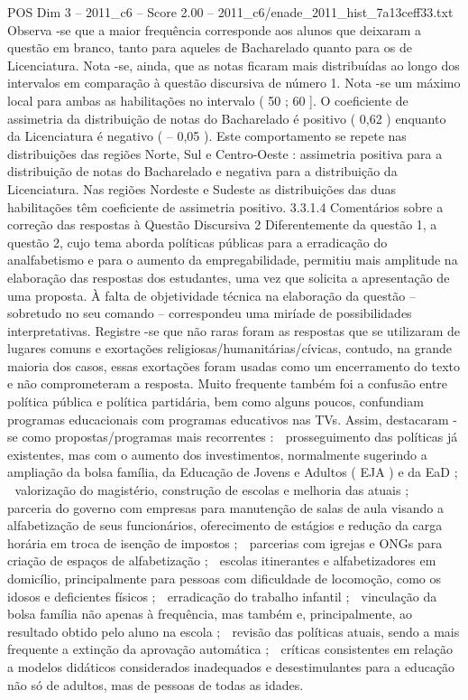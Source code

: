 \begin{textsample}{POS Dim 3 – 2011\_c6 – Score 2.00 – 2011\_c6/enade\_2011\_hist\_7a13ceff33.txt}
Observa -se que a maior frequência corresponde aos alunos que deixaram a questão em branco, tanto para aqueles de Bacharelado quanto para os de Licenciatura.
Nota -se, ainda, que as notas ficaram mais distribuídas ao longo dos intervalos em comparação à questão discursiva de número 1.
Nota -se um máximo local para ambas as habilitações no intervalo ( 50 ; 60 ].
O coeficiente de assimetria da distribuição de notas do Bacharelado é positivo ( 0,62 ) enquanto da Licenciatura é negativo ( – 0,05 ).
Este comportamento se repete nas distribuições das regiões Norte, Sul e Centro-Oeste : assimetria positiva para a distribuição de notas do Bacharelado e negativa para a distribuição da Licenciatura.
Nas regiões Nordeste e Sudeste as distribuições das duas habilitações têm coeficiente de assimetria positivo. 3.3.1.4 Comentários sobre a correção das respostas à Questão Discursiva 2 Diferentemente da questão 1, a questão 2, cujo tema aborda políticas públicas para a erradicação do analfabetismo e para o aumento da empregabilidade, permitiu mais amplitude na elaboração das respostas dos estudantes, uma vez que solicita a apresentação de uma proposta.
À falta de objetividade técnica na elaboração da questão – sobretudo no seu comando – correspondeu uma miríade de possibilidades interpretativas.
Registre -se que não raras foram as respostas que se utilizaram de lugares comuns e exortações religiosas/humanitárias/cívicas, contudo, na grande maioria dos casos, essas exortações foram usadas como um encerramento do texto e não comprometeram a resposta.
Muito frequente também foi a confusão entre política pública e política partidária, bem como alguns poucos, confundiam programas educacionais com programas educativos nas TVs.
Assim, destacaram -se como propostas/programas mais recorrentes :  prosseguimento das políticas já existentes, mas com o aumento dos investimentos, normalmente sugerindo a ampliação da bolsa família, da Educação de Jovens e Adultos ( EJA ) e da EaD ;  valorização do magistério, construção de escolas e melhoria das atuais ;  parceria do governo com empresas para manutenção de salas de aula visando a alfabetização de seus funcionários, oferecimento de estágios e redução da carga horária em troca de isenção de impostos ;  parcerias com igrejas e ONGs para criação de espaços de alfabetização ;  escolas itinerantes e alfabetizadores em domicílio, principalmente para pessoas com dificuldade de locomoção, como os idosos e deficientes físicos ;  erradicação do trabalho infantil ;  vinculação da bolsa família não apenas à frequência, mas também e, principalmente, ao resultado obtido pelo aluno na escola ;  revisão das políticas atuais, sendo a mais frequente a extinção da aprovação automática ;  críticas consistentes em relação a modelos didáticos considerados inadequados e desestimulantes para a educação não só de adultos, mas de pessoas de todas as idades.

\end{textsample}
